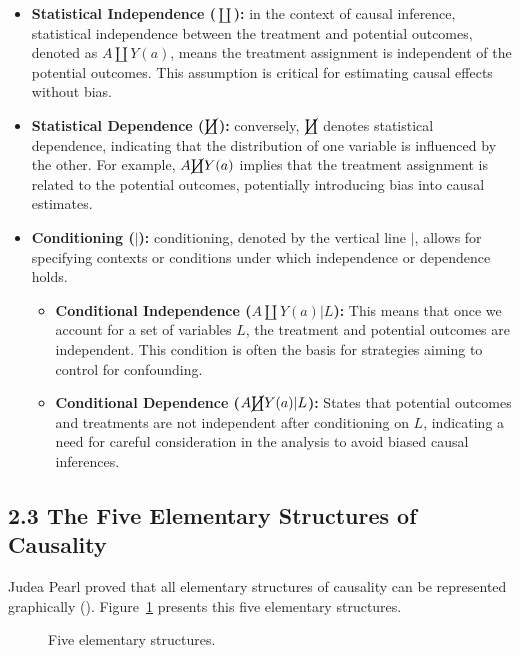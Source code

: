 \documentclass[
  singlecolumn]{article}
\begin{document}
\begin{itemize}
\item
  \textbf{Statistical Independence (\(\coprod\)):} in the context of
  causal inference, statistical independence between the treatment and
  potential outcomes, denoted as \(A \coprod Y(a)\), means the treatment
  assignment is independent of the potential outcomes. This assumption
  is critical for estimating causal effects without bias.
\item
  \textbf{Statistical Dependence (\(\cancel\coprod\)):} conversely,
  \(\cancel\coprod\) denotes statistical dependence, indicating that the
  distribution of one variable is influenced by the other. For example,
  \(A \cancel\coprod Y(a)\) implies that the treatment assignment is
  related to the potential outcomes, potentially introducing bias into
  causal estimates.
\item
  \textbf{Conditioning (\(|\)):} conditioning, denoted by the vertical
  line \(|\), allows for specifying contexts or conditions under which
  independence or dependence holds.

  \begin{itemize}
  \item
    \textbf{Conditional Independence (\(A \coprod Y(a)|L\)):} This means
    that once we account for a set of variables \(L\), the treatment and
    potential outcomes are independent. This condition is often the
    basis for strategies aiming to control for confounding.
  \item
    \textbf{Conditional Dependence (\(A \cancel\coprod Y(a)|L\)):}
    States that potential outcomes and treatments are not independent
    after conditioning on \(L\), indicating a need for careful
    consideration in the analysis to avoid biased causal inferences.
  \end{itemize}
\end{itemize}

\subsection{2.3 The Five Elementary Structures of
Causality}\label{the-five-elementary-structures-of-causality}

Judea Pearl proved that all elementary structures of causality can be
represented graphically ().
Figure~\ref{fig-directedgraph} presents this five elementary structures.

\begin{figure}

\centering{

\[
\terminologydirectedgraph
\]

}

\caption{\label{fig-directedgraph}Five elementary structures.}

\end{figure}%
\end{document}
